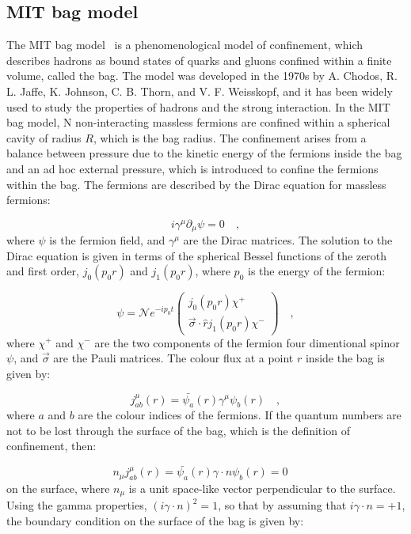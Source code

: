 \subsection{MIT bag model}
The MIT bag model~\cite{Johnson:1975zp} is a phenomenological model of confinement, which describes hadrons as bound states of quarks and gluons confined within a finite volume, called the bag. The model was developed in the 1970s by A. Chodos, R. L. Jaffe, K. Johnson, C. B. Thorn, and V. F. Weisskopf, and it has been widely used to study the properties of hadrons and the strong interaction. In the MIT bag model, N non-interacting massless fermions are confined within a spherical cavity of radius $R$, which is the bag radius. The confinement arises from a balance between pressure due to the kinetic energy of the fermions inside the bag and an ad hoc external pressure, which is introduced to confine the fermions within the bag. The fermions are described by the Dirac equation for massless fermions:

\begin{equation*}
    i\gamma^\mu\partial_\mu\psi = 0\quad ,
\end{equation*}
where $\psi$ is the fermion field, and $\gamma^\mu$ are the Dirac matrices. The solution to the Dirac equation is given in terms of the spherical Bessel functions of the zeroth and first order, $j_0(p_0r)$ and $j_1(p_0r)$, where $p_0$ is the energy of the fermion:

\begin{equation*}
    \psi = \mathcal{N} e^{-ip_0t} \begin{pmatrix} j_0(p_0r)\chi^+ \\ \vec{\sigma}\cdot\hat{r}j_1(p_0r)\chi^-\end{pmatrix}\quad ,
\end{equation*}
where $\chi^+$ and $\chi^-$ are the two components of the fermion four dimentional spinor $\psi$, and $\vec{\sigma}$ are the Pauli matrices. The colour flux at a point $r$ inside the bag is given by:

\begin{equation*}
    j_{ab}^\mu(r) = \bar{\psi_a}(r)\gamma^\mu\psi_b(r)\quad ,
\end{equation*}
where $a$ and $b$ are the colour indices of the fermions. If the quantum numbers are not to be lost through the surface of the bag, which is the definition of confinement, then:

\begin{equation*}
  n_\mu j_{ab}^\mu(r) = \bar{\psi_a}(r)\gamma\cdot n \psi_b(r) = 0\quad 
\end{equation*}
on the surface, where $n_\mu$ is a unit space-like vector perpendicular to the surface. Using the gamma properties, $(i\gamma\cdot n)^2 = 1$, so that by assuming that $i\gamma\cdot n = + 1$, the boundary condition on the surface of the bag is given by:

